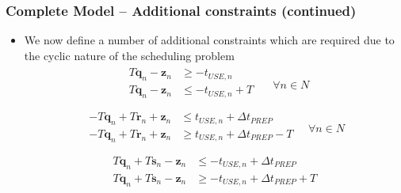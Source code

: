 \documentclass{beamer}
\begin{document}
\begin{frame}
    \frametitle{Complete Model -- Additional constraints (continued)}
    \begin{itemize}
        \item We now define a number of additional constraints which are
        required due to the cyclic nature of the scheduling problem
        \begin{equation}
            \begin{split}
                \begin{alignedat}{2}
                    T \boldsymbol{q}_{n} - \boldsymbol{z}_{n} &\ge
                    - t_{\mathit{USE},n}\\
                    T \boldsymbol{q}_{n} - \boldsymbol{z}_{n} &\le
                    - t_{\mathit{USE},n} + T\\
                \end{alignedat}
            \end{split}
            \quad \forall n \in N
        \end{equation}
        \begin{equation}
            \begin{split}
                \begin{alignedat}{2}
                    - T \boldsymbol{q}_{n} + T \boldsymbol{r}_{n} 
                    + \boldsymbol{z}_{n}
                    &\le t_{\mathit{USE},n} + \Delta t_{\mathit{PREP}}\\
                    - T \boldsymbol{q}_{n} + T \boldsymbol{r}_{n}
                    + \boldsymbol{z}_{n}
                    &\ge t_{\mathit{USE},n} + \Delta t_{\mathit{PREP}} - T\\
                    \end{alignedat}
                \quad \forall n \in N
            \end{split}
        \end{equation}
        \begin{equation}
            \begin{split}
                \begin{alignedat}{2}
                    T \boldsymbol{q}_{n} + T \boldsymbol{s}_{n} 
                    - \boldsymbol{z}_{n}
                    &\le -t_{\mathit{USE},n} + \Delta t_{\mathit{PREP}}\\
                    T \boldsymbol{q}_{n} + T \boldsymbol{s}_{n} 
                    - \boldsymbol{z}_{n}
                    &\ge -t_{\mathit{USE},n} + \Delta t_{\mathit{PREP}} + T\\

\end{alignedat}
\end{split}
\end{equation}
\end{itemize}
\end{frame}
\end{document}
